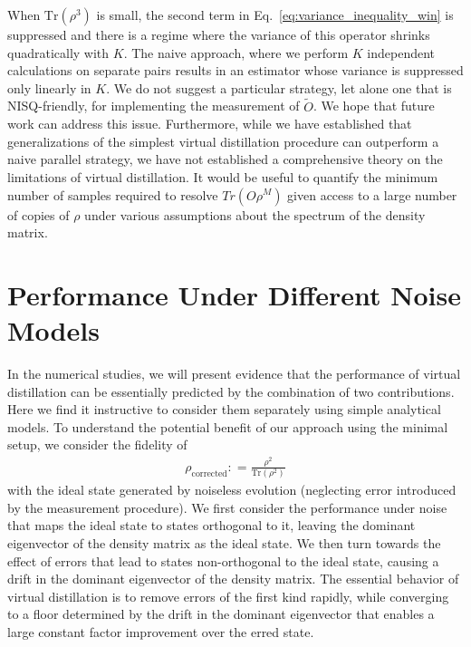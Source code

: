 \documentclass[
amsmath,
amssymb,
aps,
pra,
reprint,
twocolumn,
superscriptaddress,
longbibliography,
showkeys,
floatfix
]{revtex4-1}
\newcommand{\defeq}{\mathrel{\mathop:}=}
\def\tr{\mathrm{Tr}}
\newcommand{\eq}[1]{Eq.~\hyperref[eq:#1]{\ref*{eq:#1}}}
\begin{document}
When \(\tr(\rho^3)\) is small, the second term in \eq{variance_inequality_win} is suppressed and there is a
regime where the variance of this operator shrinks quadratically with \(K\).
The naive approach, where we perform \(K\) independent
calculations on separate pairs results in an estimator whose variance is
suppressed only linearly in \(K\).
We do not suggest a particular strategy, let alone one that is NISQ-friendly,
for implementing the measurement of \(\tilde{O}\).
We hope that future work can address this issue.
Furthermore, while we have established that generalizations of the simplest
virtual distillation procedure can outperform a naive parallel strategy, we have
not established a comprehensive theory on the limitations of virtual
distillation.
It would be useful to quantify the minimum number of samples required to resolve
\(Tr(O\rho^M)\) given access to a large number of copies of \(\rho\) under various
assumptions about the spectrum of the density matrix.

\section{Performance Under Different Noise Models}
\label{sec:analytical_performance}
In the numerical studies, we will present evidence that the performance of virtual
distillation can be essentially predicted by the combination of two
contributions. Here we find it instructive to consider them separately using
simple analytical models. 
To understand the potential benefit 
of our approach using the minimal setup, we consider the
fidelity of
\begin{align}
  \rho_\textrm{corrected} \defeq \frac{\rho^2}{\tr( \rho^2 )}
\end{align}
with the ideal state generated by noiseless evolution (neglecting error
introduced by the measurement procedure). 
We first consider the performance under noise that maps the ideal state to
states orthogonal to it, leaving the dominant eigenvector of the density matrix
as the ideal state.
We then turn towards the effect of errors that lead to states non-orthogonal to
the ideal state, causing a drift in the dominant eigenvector of the density
matrix.
The essential behavior of virtual distillation is to remove errors of the first
kind rapidly, while converging to a floor determined by the drift in the
dominant eigenvector that enables a large constant factor improvement over the
erred state.
\end{document}
